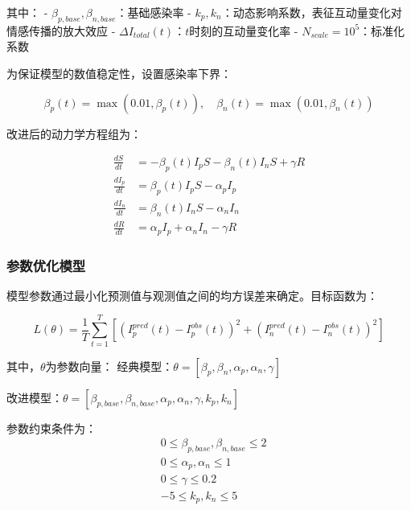 \documentclass[withoutpreface,bwprint]{cumcmthesis}
\begin{document}
其中：
- $\beta_{p,base}, \beta_{n,base}$：基础感染率
- $k_p, k_n$：动态影响系数，表征互动量变化对情感传播的放大效应
- $\Delta I_{total}(t)$：$t$时刻的互动量变化率
- $N_{scale} = 10^5$：标准化系数

为保证模型的数值稳定性，设置感染率下界：

\begin{equation}
\label{eq:infection_rate_bound}
\beta_p(t) = \max(0.01, \beta_p(t)), \quad \beta_n(t) = \max(0.01, \beta_n(t))
\end{equation}

改进后的动力学方程组为：

\begin{equation}
\label{eq:sir_improved}
\begin{aligned}
\frac{dS}{dt} &= -\beta_p(t) I_p S - \beta_n(t) I_n S + \gamma R \\
\frac{dI_p}{dt} &= \beta_p(t) I_p S - \alpha_p I_p \\
\frac{dI_n}{dt} &= \beta_n(t) I_n S - \alpha_n I_n \\
\frac{dR}{dt} &= \alpha_p I_p + \alpha_n I_n - \gamma R
\end{aligned}
\end{equation}

\subsubsection{参数优化模型}

模型参数通过最小化预测值与观测值之间的均方误差来确定。目标函数为：

\begin{equation}
\label{eq:objective_function}
L(\theta) = \frac{1}{T}\sum_{t=1}^{T}\left[(I_p^{pred}(t) - I_p^{obs}(t))^2 + (I_n^{pred}(t) - I_n^{obs}(t))^2\right]
\end{equation}

其中，$\theta$为参数向量：
经典模型：$\theta = [\beta_p, \beta_n, \alpha_p, \alpha_n, \gamma]$

改进模型：$\theta = [\beta_{p,base}, \beta_{n,base}, \alpha_p, \alpha_n, \gamma, k_p, k_n]$

参数约束条件为：
\begin{equation}
\label{eq:parameter_constraints}
\begin{aligned}
&0 \leq \beta_{p,base}, \beta_{n,base} \leq 2 \\
&0 \leq \alpha_p, \alpha_n \leq 1 \\
&0 \leq \gamma \leq 0.2 \\
&-5 \leq k_p, k_n \leq 5
\end{aligned}
\end{equation}
\end{document}
